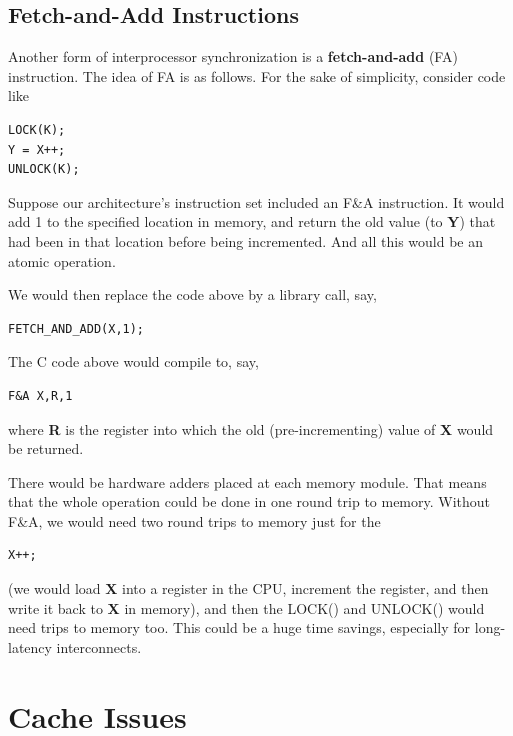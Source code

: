 \subsection{Fetch-and-Add Instructions} 
\label{fanda}

\setlength{\parindent}{0in}

Another form of interprocessor synchronization is a
\textbf{fetch-and-add} (FA) instruction.  The idea of FA is as follows.
For the sake of simplicity, consider code like

\begin{Verbatim}[fontsize=\relsize{-2}]
LOCK(K);
Y = X++;
UNLOCK(K);
\end{Verbatim}

Suppose our architecture's instruction set included an F\&A instruction.
It would add 1 to the specified location in memory, and return the old
value (to {\bf Y}) that had been in that location before being incremented.
And all this would be an atomic operation.

We would then replace the code above by a library call, say,

\begin{Verbatim}[fontsize=\relsize{-2}]
FETCH_AND_ADD(X,1);
\end{Verbatim}

The C code above would compile to, say,

\begin{Verbatim}[fontsize=\relsize{-2}]
F&A X,R,1
\end{Verbatim}

where {\bf R} is the register into which the old (pre-incrementing)
value of {\bf X} would be returned.

There would be hardware adders placed at each memory module. That means
that the whole operation could be done in one round trip to memory.
Without F\&A, we would need two round trips to memory just for the

\begin{Verbatim}[fontsize=\relsize{-2}]
X++;
\end{Verbatim}

(we would load {\bf X} into a register in the CPU, increment the register, and
then write it back to {\bf X} in memory), and then the LOCK() and UNLOCK()
would need trips to memory too.  This could be a huge time savings,
especially for long-latency interconnects.

\section{Cache Issues}
\label{cacheissues}

